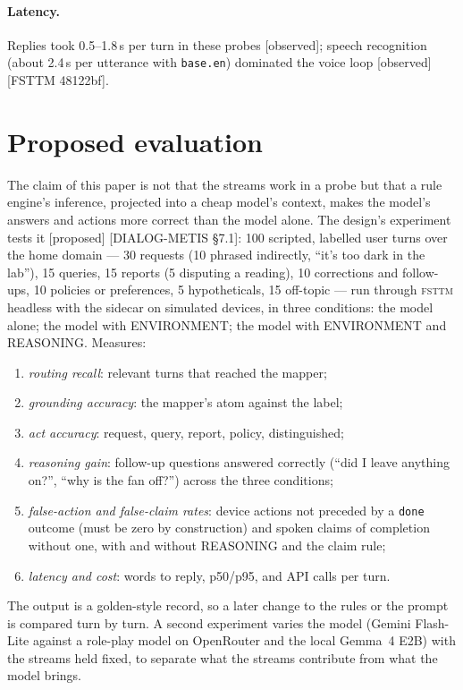 \documentclass[11pt]{article}
\newcommand{\fsttm}{\textsc{fsttm}}
\newcommand{\src}[1]{{\footnotesize\textsf{[#1]}}}
\newcommand{\observed}{\textsf{\small[observed]}}
\newcommand{\proposed}{\textsf{\small[proposed]}}
\begin{document}
\paragraph{Latency.} Replies took 0.5--1.8\,s per turn in these probes \observed; speech
recognition (about 2.4\,s per utterance with \texttt{base.en}) dominated the voice loop
\observed{} \src{FSTTM 48122bf}.

\section{Proposed evaluation}\label{sec:eval}

The claim of this paper is not that the streams work in a probe but that a rule engine's
inference, projected into a cheap model's context, makes the model's answers and actions more
correct than the model alone. The design's experiment tests it \proposed{} \src{DIALOG-METIS
\S7.1}: 100 scripted, labelled user turns over the home domain --- 30 requests (10 phrased
indirectly, ``it's too dark in the lab''), 15 queries, 15 reports (5 disputing a reading), 10
corrections and follow-ups, 10 policies or preferences, 5 hypotheticals, 15 off-topic ---
run through \fsttm{} headless with the sidecar on simulated devices, in three conditions:
the model alone; the model with ENVIRONMENT; the model with ENVIRONMENT and REASONING.
Measures:

\begin{enumerate}[nosep]
\item \emph{routing recall}: relevant turns that reached the mapper;
\item \emph{grounding accuracy}: the mapper's atom against the label;
\item \emph{act accuracy}: request, query, report, policy, distinguished;
\item \emph{reasoning gain}: follow-up questions answered correctly (``did I leave anything
on?'', ``why is the fan off?'') across the three conditions;
\item \emph{false-action and false-claim rates}: device actions not preceded by a
\texttt{done} outcome (must be zero by construction) and spoken claims of completion without
one, with and without REASONING and the claim rule;
\item \emph{latency and cost}: words to reply, p50/p95, and API calls per turn.
\end{enumerate}

\noindent The output is a golden-style record, so a later change to the rules or the prompt
is compared turn by turn. A second experiment varies the model (Gemini Flash-Lite against a
role-play model on OpenRouter and the local Gemma~4 E2B) with the streams held fixed, to
separate what the streams contribute from what the model brings.
\end{document}
